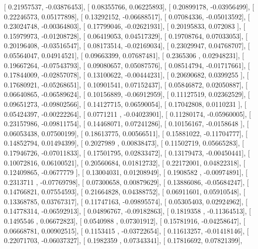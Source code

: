\documentclass{article}
\begin{document}
       [ 0.21957537, -0.03876453],
       [ 0.08355766,  0.06225893],
       [ 0.20899178, -0.03956499],
       [ 0.22246573,  0.05177898],
       [ 0.13292152, -0.06688517],
       [ 0.07084336, -0.05013592],
       [ 0.23024748, -0.00364803],
       [ 0.17799046, -0.02621931],
       [ 0.20195833,  0.072083  ],
       [ 0.15979973, -0.01208728],
       [ 0.06419053,  0.04517329],
       [ 0.19708764,  0.07033053],
       [ 0.20196408, -0.03516547],
       [ 0.08173514, -0.02169034],
       [ 0.23029947,  0.04768707],
       [ 0.05564047,  0.04914521],
       [ 0.09663399,  0.07687481],
       [ 0.2365306 ,  0.02948231],
       [ 0.19667264, -0.07543793],
       [ 0.09080657,  0.05087576],
       [ 0.08514794, -0.01717661],
       [ 0.17844009, -0.02857078],
       [ 0.13100622, -0.00444231],
       [ 0.20690682,  0.0399255 ],
       [ 0.17680921, -0.05268651],
       [ 0.10901541,  0.07152437],
       [ 0.05846872,  0.02050887],
       [ 0.06640865, -0.06589624],
       [ 0.10156889, -0.06912959],
       [ 0.11127519,  0.02362529],
       [ 0.09651273, -0.09802566],
       [ 0.14127715,  0.06590054],
       [ 0.17042808,  0.0110231 ],
       [ 0.05424397, -0.00222264],
       [ 0.0771211 , -0.04023901],
       [ 0.11280174, -0.05960005],
       [ 0.23157986, -0.09811754],
       [ 0.14468071,  0.07241286],
       [ 0.10156167, -0.0158648 ],
       [ 0.06053438,  0.07500199],
       [ 0.18613775,  0.00566511],
       [ 0.15881022, -0.11704777],
       [ 0.14852794,  0.01494399],
       [ 0.2027989 ,  0.00838473],
       [ 0.11502719,  0.05665283],
       [ 0.17946726, -0.07011833],
       [ 0.17501795,  0.02833472],
       [ 0.13179473, -0.00450441],
       [ 0.10072816,  0.06100521],
       [ 0.20560684,  0.01812732],
       [ 0.22172001,  0.04822318],
       [ 0.12409865, -0.0677779 ],
       [ 0.13004031,  0.01208949],
       [ 0.1908582 , -0.00974891],
       [ 0.2313711 , -0.07769798],
       [ 0.07300658,  0.00879629],
       [ 0.13886086, -0.05684247],
       [ 0.14766821,  0.07554593],
       [ 0.21664828,  0.04388752],
       [ 0.06911601,  0.05910548],
       [ 0.13368785,  0.03767317],
       [ 0.11747163, -0.09895574],
       [ 0.05305403,  0.02924962],
       [ 0.14778314, -0.06592913],
       [ 0.04896767, -0.09182863],
       [ 0.1819358 , -0.11364513],
       [ 0.1495546 ,  0.06672823],
       [ 0.0540988 ,  0.07301912],
       [ 0.15781916, -0.04258647],
       [ 0.06668781,  0.00902515],
       [ 0.1153415 , -0.03722654],
       [ 0.11613257, -0.01418146],
       [ 0.22071703, -0.06037327],
       [ 0.1982359 ,  0.07343341],
       [ 0.17816692,  0.07821399],
\end{document}
